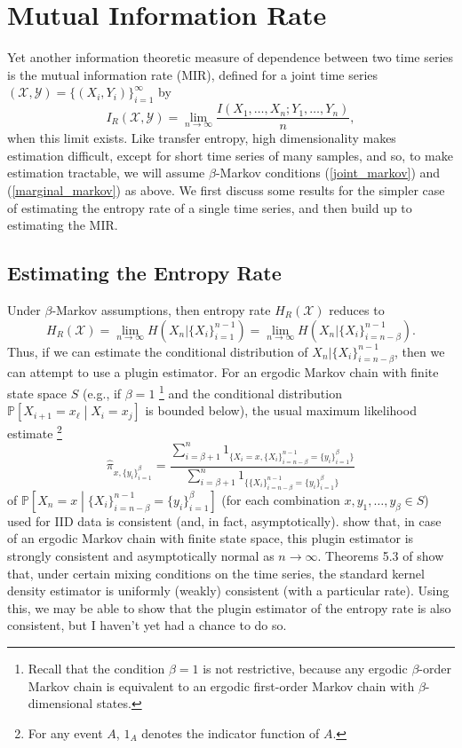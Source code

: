 \documentclass{article} %
\newcommand{\X}{\mathcal{X}}                        %
\newcommand{\Y}{\mathcal{Y}}                        %
\newcommand{\pr}{\mathbb{P}}                        %
\begin{document}
\section{Mutual Information Rate}
Yet another information theoretic measure of dependence between two time series
is the mutual information rate (MIR), defined for a joint time series
$(\X,\Y) = \{(X_i,Y_i)\}_{i = 1}^\infty$ by
\[I_R(\X,\Y)= \lim_{n \to \infty} \frac{I(X_1,\dots,X_n;Y_1,\dots,Y_n)}{n},\]
when this limit exists. Like transfer entropy, high dimensionality makes
estimation difficult, except for short time series of many samples, and so, to
make estimation tractable, we will assume $\beta$-Markov conditions
(\ref{joint_markov}) and (\ref{marginal_markov}) as above. We first discuss
some results for the simpler case of estimating the entropy rate of a single
time series, and then build up to estimating the MIR.

\subsection{Estimating the Entropy Rate}
Under $\beta$-Markov assumptions, then entropy rate $H_R(\X)$ reduces to
\begin{equation}
H_R(\X)
    = \lim_{n \to \infty} H(X_n | \{X_i\}_{i = 1}^{n - 1})
    = \lim_{n \to \infty} H(X_n | \{X_i\}_{i = n - \beta}^{n - 1}).
\label{eq:reduced_HR}
\end{equation}
Thus, if we can estimate the conditional distribution of
$X_n | \{X_i\}_{i = n - \beta}^{n - 1}$, then we can attempt to use a plugin
estimator. For an ergodic Markov chain with finite state space $S$ (e.g., if
$\beta = 1$
\footnote{Recall that the condition $\beta = 1$ is not restrictive, because any
ergodic $\beta$-order Markov chain is equivalent to an ergodic first-order
Markov chain with $\beta$-dimensional states.}
and the conditional distribution
$\pr\left[ X_{i + 1} = x_\ell \middle| X_i = x_j \right]$ is bounded below),
the usual maximum likelihood estimate
\footnote{For any event $A$, $1_A$ denotes the indicator function of $A$.}
\[\hat \pi_{x,\{y_i\}_{i = 1}^\beta}
    =   \frac{\sum_{i = \beta + 1}^n 1_{\{X_i = x,
            \{X_i\}_{i = n - \beta}^{n - 1} = \{y_i\}_{i = 1}^{\beta}\}}}
        {\sum_{i = \beta + 1}^n
        1_{\{\{X_i\}_{i = n - \beta}^{n - 1} = \{y_i\}_{i = 1}^{\beta}\}}}
\]
of $\pr\left[ X_n = x
    \middle| \{X_i\}_{i = n - \beta}^{n - 1} = \{y_i\}_{i = 1}^{\beta} \right]$
(for each combination $x,y_1,\dots,y_\beta \in S$) used for IID data is
consistent (and, in fact, asymptotically). \cite{ciuperca05entropyRate} show
that, in case of an ergodic Markov chain with finite state space, this plugin
estimator is strongly consistent and asymptotically normal as $n \to \infty$.
Theorems 5.3 of \cite{fan03timeSeries} show that, under certain mixing
conditions on the time series, the standard kernel density estimator is
uniformly (weakly) consistent (with a particular rate). Using this, we may be
able to show that the plugin estimator of the entropy rate is also consistent,
but I haven't yet had a chance to do so.
\end{document}
